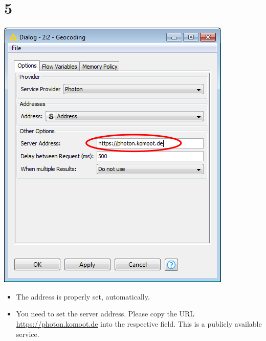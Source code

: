 \documentclass[10pt]{beamer}
\begin{document}
\section{5}
\begin{frame}
	\begin{center}
  		\includegraphics[height=0.6\textheight]{5.png}
	\end{center}
	\begin{itemize}
    \item The address is properly set, automatically.
		\item You need to set the server address. Please copy the URL  \url{https://photon.komoot.de} into the respective field. This is a publicly available service.
	\end{itemize}
\end{frame}
\end{document}
